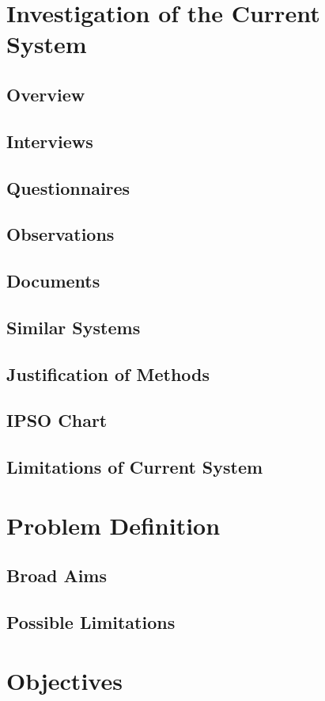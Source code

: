 \section{Investigation of the Current System}

\subsection{Overview}
\subsection{Interviews}
\subsection{Questionnaires}
\subsection{Observations}
\subsection{Documents}
\subsection{Similar Systems}
\subsection{Justification of Methods}
\subsection{IPSO Chart}
\subsection{Limitations of Current System}

\section{Problem Definition}

\subsection{Broad Aims}

\subsection{Possible Limitations}

\section{Objectives}